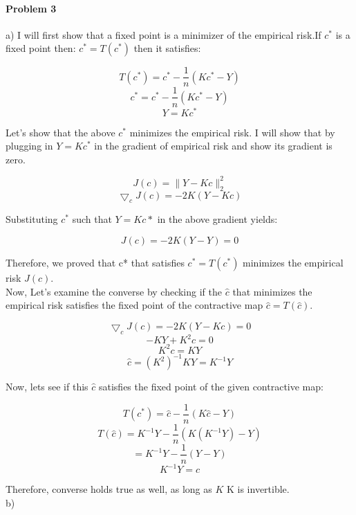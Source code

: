 \documentclass[12pt]{report}
\begin{document}
\paragraph{Problem 3}
a)
I will first show that a fixed point is a minimizer of the empirical risk.If $c^*$ is a fixed point then: $ c^* = T(c^*) $ then it satisfies:

$$ T(c^*) = c^* - \frac{1}{n}(Kc^*-Y) $$ 
$$ c^* = c^* - \frac{1}{n}(Kc^*-Y) $$
$$ Y = Kc^* $$

Let's show that the above $c^*$ minimizes the empirical risk. I will show that by plugging in $ Y = Kc^* $ in the gradient of empirical risk and show its gradient is zero.

$$ J(c) = \|Y-Kc\|_2^2 $$
$$ \bigtriangledown_c J(c) = -2K(Y-Kc)$$

Substituting $c^*$ such that $Y=Kc*$ in the above gradient yields:

$$ J(c) = -2K(Y-Y) =0 $$

Therefore, we proved that c* that satisfies $c^* = T(c^*) $ minimizes the empirical risk $J(c)$. \\

Now, Let's examine the converse by checking if the $\hat{c}$ that minimizes the empirical risk satisfies the fixed point of the contractive map $ \hat{c}= T(\hat{c}) $.

$$ \bigtriangledown_c J(c) = -2K(Y-Kc) = 0 $$
$$ -KY + K^2c = 0$$
$$K^2c =  KY$$
$$ \hat{c} = (K^2)^{-1}KY = K^{-1}Y$$

Now, lets see if this $\hat{c}$ satisfies the fixed point of the given contractive map:

$$ T(c^*) = \hat{c} - \frac{1}{n}(K\hat{c}-Y) $$ 
$$ T(\hat{c}) = K^{-1}Y - \frac{1}{n} (K(K^{-1}Y) - Y)$$
$$ = K^{-1}Y - \frac{1}{n}(Y-Y) $$
$$ K^{-1}Y = \hat{c}$$

Therefore, converse holds true as well, as long as $K$ K is invertible. \\

b)
\end{document}
